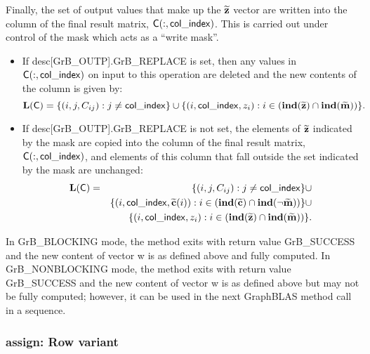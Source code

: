 Finally, the set of output values that make up the ${\bf \widetilde{z}}$ 
vector are written into the column of the final result matrix, ${\sf C}(:,{\sf col\_index})$.  
This is carried out under control of the mask which acts as a ``write mask''.
\begin{itemize}
\item If {\sf desc[GrB\_OUTP].GrB\_REPLACE} is set, then any values in ${\sf C}(:,{\sf col\_index})$ 
on input to this operation are deleted and the new contents of the column is given by:
\[
\bold{L}({\sf C}) = \{ (i,j,C_{ij}) : j \neq {\sf col\_index} \} \cup \{(i,{\sf col\_index},z_{i}) : i \in 
(\bold{ind}({\bf \widetilde{z}}) 
\cap \bold{ind}({\bf \widetilde{m}})) \}. 
\]

\item If {\sf desc[GrB\_OUTP].GrB\_REPLACE} is not set, the elements of 
${\bf \widetilde{z}}$ indicated by the mask are copied into the column 
of the final result matrix, ${\sf C}(:,{\sf col\_index})$, and elements of 
this column that fall outside the set indicated by 
the mask are unchanged:
\begin{eqnarray} 
    \bold{L}({\sf C}) & = & \{ (i,j,C_{ij}) : j \neq {\sf col\_index} \} \cup \nonumber \\
    & & \{(i,{\sf col\_index},{\bf \widetilde{c}}(i)) : i \in (\bold{ind}({\bf \widetilde{c}}) 
    \cap \bold{ind}(\neg {\bf \widetilde{m}})) \} \cup \nonumber \\
    & & \{(i,{\sf col\_index},z_{i}) : i \in 
    (\bold{ind}({\bf \widetilde{z}}) \cap \bold{ind}({\bf \widetilde{m}})) \}. \nonumber
\end{eqnarray}
\end{itemize}

In {\sf GrB\_BLOCKING} mode, the method exits with return value 
{\sf GrB\_SUCCESS} and the new content of vector {\sf w} is as defined above
and fully computed.  
In {\sf GrB\_NONBLOCKING} mode, the method exits with return value 
{\sf GrB\_SUCCESS} and the new content of vector {\sf w} is as defined above 
but may not be fully computed; however, it can be used in the next GraphBLAS 
method call in a sequence.



\subsubsection{{\sf assign}: Row variant}


